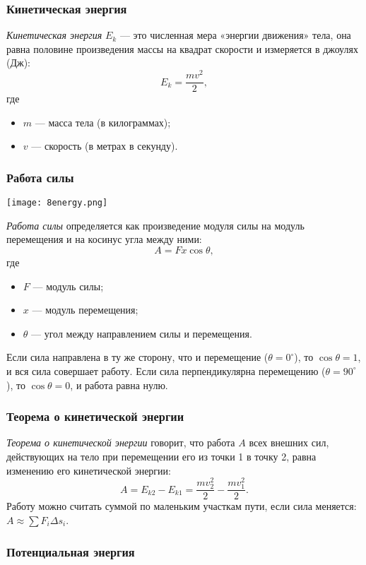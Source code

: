 \documentclass[12pt, a4paper]{article}%
\begin{document}
\subsubsection*{Кинетическая энергия}

\textit{Кинетическая энергия} $E_k$ — это численная мера «энергии движения» тела, она равна половине произведения массы на квадрат скорости и измеряется в джоулях (Дж):
\[
E_k = \frac{m v^2}{2},
\]
где
\begin{itemize}
  \item $m$ — масса тела (в килограммах);
  \item $v$ — скорость (в метрах в секунду).
\end{itemize}

\subsubsection*{Работа силы}

\begin{center}
\texttt{[image: 8energy.png]}
\label{fig:mpr}
\end{center}

\textit{Работа силы} определяется как произведение модуля силы на модуль перемещения и на косинус угла между ними:
\[
A = Fx\cos\theta,
\]
где
\begin{itemize}
  \item $F$ — модуль силы;
  \item $x$ — модуль перемещения;
  \item $\theta$ — угол между направлением силы и перемещения.
\end{itemize}
Если сила направлена в ту же сторону, что и перемещение ($\theta = 0^\circ$), то $\cos\theta = 1$, и вся сила совершает работу. Если сила перпендикулярна перемещению ($\theta = 90^\circ$), то $\cos\theta = 0$, и работа равна нулю.


\subsubsection*{Теорема о кинетической энергии}
\textit{Теорема о кинетической энергии} говорит, что работа $A$ всех внешних сил, действующих на тело при перемещении его из точки 1 в точку 2, равна изменению его кинетической энергии:
\[
A = E_{k2} - E_{k1} = \frac{m v_2^2}{2} - \frac{m v_1^2}{2}.
\]
Работу можно считать суммой по маленьким участкам пути, если сила меняется: $A\approx\sum F_i\Delta s_i$.

\subsubsection*{Потенциальная энергия}
\end{document}
